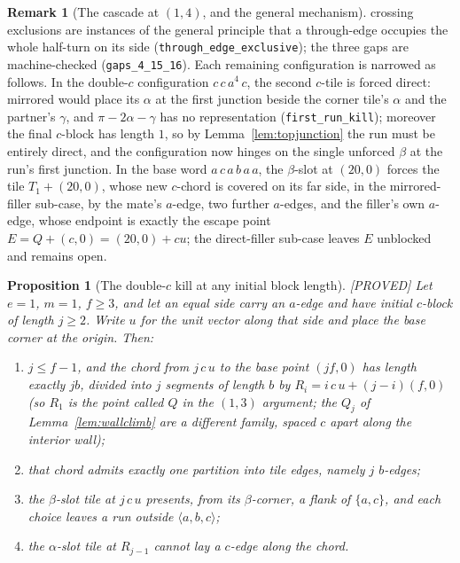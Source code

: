 \documentclass[11pt,reqno]{amsart}
\theoremstyle{plain}
\newtheorem{proposition}[theorem]{Proposition}
\theoremstyle{definition}
\newtheorem{remark}[theorem]{Remark}
\newcommand{\lab}[1]{\hfill\textnormal{\footnotesize\textsc{[#1]}}}
\begin{document}
\begin{remark}[The cascade at $(1,4)$, and the general mechanism]
crossing exclusions are instances of the general principle that a through-edge occupies the whole
half-turn on its side (\texttt{through\_edge\_exclusive}); the three gaps are machine-checked
(\texttt{gaps\_4\_15\_16}). Each remaining configuration is narrowed as follows. In the
double-$c$ configuration $c\,c\,a^4\,c$, the second $c$-tile is forced direct: mirrored would place
its $\alpha$ at the first junction beside the corner tile's $\alpha$ and the partner's $\gamma$,
and $\pi-2\alpha-\gamma$ has no representation (\texttt{first\_run\_kill}); moreover the final
$c$-block has length $1$, so by Lemma~\ref{lem:topjunction} the run must be entirely direct, and the
configuration now hinges on the single unforced $\beta$ at the run's first junction. In the base
word $a\,c\,a\,b\,a\,a$, the $\beta$-slot at $(20,0)$ forces the tile $T_1+(20,0)$, whose new
$c$-chord is covered on its far side, in the mirrored-filler sub-case, by the mate's $a$-edge, two
further $a$-edges, and the filler's own $a$-edge, whose endpoint is exactly the escape point
$E=Q+(c,0)=(20,0)+cu$; the direct-filler sub-case leaves $E$ unblocked and remains open.
\end{remark}

\begin{proposition}[The double-$c$ kill at any initial block length]\label{prop:doublec}\lab{PROVED}
Let $e=1$, $m=1$, $f\ge3$, and let an equal side carry an $a$-edge and have initial $c$-block of
length $j\ge2$. Write $u$ for the unit vector along that side and place the base corner at the
origin. Then:
\begin{enumerate}
\item[\textup{(i)}] $j\le f-1$, and the chord from $j\,c\,u$ to the base point $(jf,0)$ has length
exactly $jb$, divided into $j$ segments of length $b$ by $R_i=i\,c\,u+(j-i)(f,0)$ (so $R_1$ is the
point called $Q$ in the $(1,3)$ argument; the $Q_j$ of Lemma~\ref{lem:wallclimb} are a different
family, spaced $c$ apart along the interior wall);
\item[\textup{(ii)}] that chord admits exactly one partition into tile edges, namely $j$ $b$-edges;
\item[\textup{(iii)}] the $\beta$-slot tile at $j\,c\,u$ presents, from its $\beta$-corner, a flank
of $\{a,c\}$, and each choice leaves a run outside $\langle a,b,c\rangle$;
\item[\textup{(iv)}] the $\alpha$-slot tile at $R_{j-1}$ cannot lay a $c$-edge along the chord.
\end{enumerate}
\end{proposition}
\end{document}
